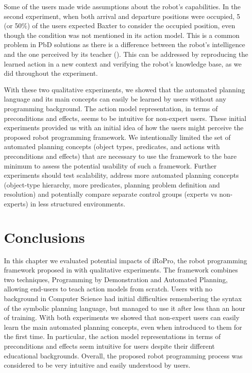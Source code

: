 Some of the users made wide assumptions about the robot's capabilities. 
In the second experiment, when both arrival and departure positions were occupied, 5 (or 50\%) of the users expected Baxter to consider the occupied position, even though the condition was not mentioned in its action model.
This is a common problem in PbD solutions as there is a difference between the robot's intelligence and the one perceived by its teacher (\cite{suay2012practical}).
This can be addressed by reproducing the learned action in a new context and verifying the robot's knowledge base, as we did throughout the experiment.

With these two qualitative experiments, we showed that the automated planning language and its main concepts can easily be learned by users without any programming background. 
The action model representation, in terms of preconditions and effects, seems to be intuitive for non-expert users. 
These initial experiments provided us with an initial idea of how the users might perceive the proposed robot programming framework. 
We intentionally limited the set of automated planning concepts (\ie object types, predicates, and actions with preconditions and effects) that are necessary to use the framework to the bare minimum to assess the potential usability of such a framework. 
Further experiments should test scalability, address more automated planning concepts (\eg object-type hierarchy, more predicates, planning problem definition and resolution) and potentially compare separate control groups (\eg experts vs non-experts) in less structured environments.

\section{Conclusions}
In this chapter we evaluated potential impacts of iRoPro, the robot programming framework proposed in  with qualitative experiments. 
The framework combines two techniques, Programming by Demonstration and Automated Planning, allowing end-users to teach action models from scratch.
Users with no background in Computer Science had initial difficulties remembering the syntax of the symbolic planning language, but managed to use it after less than an hour of training.
With both experiments we showed that non-expert users can easily learn the main automated planning concepts, even when introduced to them for the first time.
In particular, the action model representations in terms of preconditions and effects seem intuitive for users despite their different educational backgrounds.
Overall, the proposed robot programming process was considered to be very intuitive and easily understood by users. 

